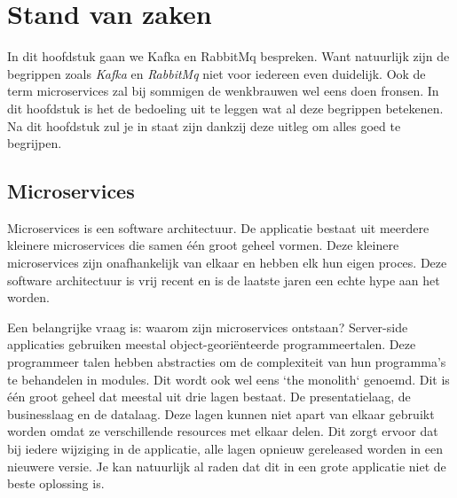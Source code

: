 \chapter{Stand van zaken}
\label{ch:stand-van-zaken}

In dit hoofdstuk gaan we Kafka en RabbitMq bespreken. Want natuurlijk zijn de begrippen zoals \emph{Kafka} en \emph{RabbitMq} niet voor iedereen even duidelijk. Ook de term microservices zal bij sommigen de wenkbrauwen wel eens doen fronsen. In dit hoofdstuk is het de bedoeling uit te leggen wat al deze begrippen betekenen. Na dit hoofdstuk zul je in staat zijn dankzij deze uitleg om alles goed te begrijpen.
\section{Microservices}

Microservices is een software architectuur. De applicatie bestaat uit meerdere kleinere microservices die samen één groot geheel vormen. Deze kleinere microservices zijn onafhankelijk van elkaar en hebben elk hun eigen proces. Deze software architectuur is vrij recent en is de laatste jaren een echte hype aan het worden.

Een belangrijke vraag is: waarom zijn microservices ontstaan? Server-side applicaties gebruiken meestal object-georiënteerde programmeertalen. Deze programmeer talen hebben abstracties om de complexiteit van hun programma's te behandelen in modules. Dit wordt ook wel eens `the monolith` genoemd. Dit is één groot geheel dat meestal uit drie lagen bestaat. De presentatielaag, de businesslaag en de datalaag. Deze lagen kunnen niet apart van elkaar gebruikt worden omdat ze verschillende resources met elkaar delen. Dit zorgt ervoor dat bij iedere wijziging in de applicatie, alle lagen opnieuw gereleased worden in een nieuwere versie. Je kan natuurlijk al raden dat dit in een grote applicatie niet de beste oplossing is. 

